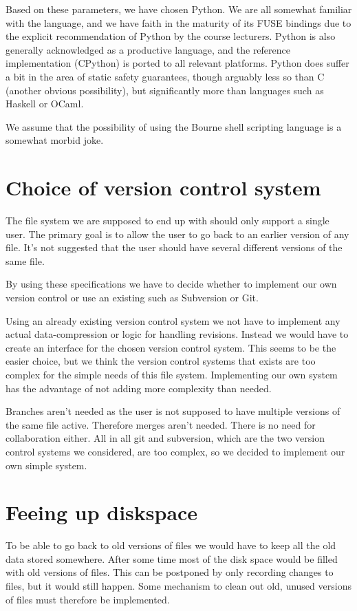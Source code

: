 \documentclass[12pt]{article}
\begin{document}
Based on these parameters, we have chosen Python. We are all somewhat
familiar with the language, and we have faith in the maturity of its
FUSE bindings due to the explicit recommendation of Python by the
course lecturers. Python is also generally acknowledged as a
productive language, and the reference implementation (CPython) is
ported to all relevant platforms. Python does suffer a bit in the
area of static safety guarantees, though arguably less so than C
(another obvious possibility), but significantly more than languages
such as Haskell or OCaml.
 
We assume that the possibility of using the Bourne shell scripting
language is a somewhat morbid joke.
 
\section{Choice of version control system}
The file system we are supposed to end up with should only support a single user. 
The primary goal is to allow the user to go back to an earlier version of any file. It's not suggested that the user should have several different versions of the same file.

By using these specifications we have to decide whether to implement our own version control or use an existing such as Subversion or Git.

Using an already existing version control system we not have to implement any actual data-compression or logic for handling revisions. Instead we would have to create an interface for the chosen version control system. This seems to be the easier choice, but we think the version control systems that exists are too complex for the simple needs of this file system. Implementing our own system has the advantage of not adding more complexity than needed. 

Branches aren't needed as the user is not supposed to have multiple versions of the same file active. Therefore merges aren't needed. There is no need for collaboration either. All in all git and subversion, which are the two version control systems we considered, are too complex, so we decided to implement our own simple system.
 
\section{Feeing up diskspace}

To be able to go back to old versions of files we would have to keep all the old data stored somewhere. After some time most of the disk space would be filled with old versions of files. This can be postponed by only recording changes to files, but it would still happen. Some mechanism to clean out old, unused versions of files must therefore be implemented.
\end{document}
